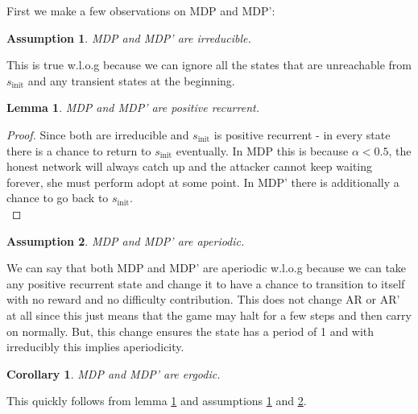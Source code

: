 \documentclass{article}
\newtheorem{corollary}[theorem]{Corollary}
\newtheorem{lemma}[theorem]{Lemma}
\newtheorem{assumption}{Assumption}
\begin{document}
First we make a few observations on MDP and MDP':
\begin{assumption}\label{assumption_irreducible}
    MDP and MDP' are irreducible.
\end{assumption}
This is true w.l.o.g because we can ignore all the states that are unreachable from $s_\text{init}$ and any transient states at the beginning.

\begin{lemma}\label{assumption_positive_recurrent}
    MDP and MDP' are positive recurrent.
\end{lemma}
\begin{proof}
     Since both are irreducible and $s_\text{init}$ is positive recurrent - in every state there is a chance to return to $s_\text{init}$ eventually. In MDP this is because $\alpha < 0.5$, the honest network will always catch up and the attacker cannot keep waiting forever, she must perform adopt at some point. In MDP' there is additionally a chance to go back to $s_\text{init}$. \\
\end{proof}

\begin{assumption}\label{assumption_aperiodic}
    MDP and MDP' are aperiodic.
\end{assumption}
We can say that both MDP and MDP' are aperiodic w.l.o.g because we can take any positive recurrent state and change it to have a chance to transition to itself with no reward and no difficulty contribution. This does not change AR or AR' at all since this just means that the game may halt for a few steps and then carry on normally. But, this change ensures the state has a period of 1 and with irreducibly this implies aperiodicity.

\begin{corollary}
    MDP and MDP' are ergodic.
\end{corollary}
This quickly follows from lemma \ref{assumption_positive_recurrent} and assumptions \ref{assumption_irreducible} and \ref{assumption_aperiodic}.
\end{document}
